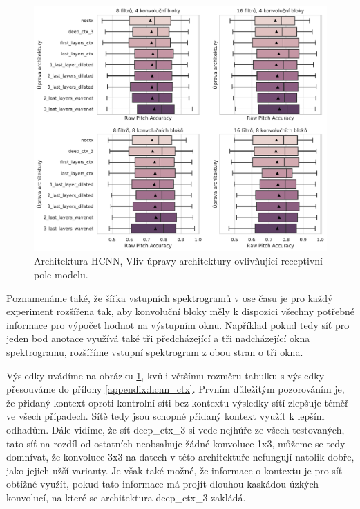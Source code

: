 \begin{figure}[h]\centering
    \includegraphics[width=\textwidth,height=\textheight,keepaspectratio]{../img/figures/spectrogram_ctx_archs}
\caption{Architektura HCNN, Vliv úpravy architektury ovlivňující receptivní pole modelu.}\label{obr:spectrogram_ctx_archs}
\end{figure}

Poznamenáme také, že šířka vstupních spektrogramů v ose času je pro každý experiment rozšířena tak, aby konvoluční bloky měly k dispozici všechny potřebné informace pro výpočet hodnot na výstupním oknu. Například pokud tedy síť pro jeden bod anotace využívá také tři předcházející a tři nadcházející okna spektrogramu, rozšíříme vstupní spektrogram z obou stran o tři okna.


Výsledky uvádíme na obrázku \ref{obr:spectrogram_ctx_archs}, kvůli většímu rozměru tabulku s výsledky přesouváme do přílohy \ref{appendix:hcnn_ctx}. Prvním důležitým pozorováním je, že přidaný kontext oproti kontrolní síti bez kontextu výsledky sítí zlepšuje téměř ve všech případech. Sítě tedy jsou schopné přidaný kontext využít k lepším odhadům. Dále vidíme, že síť deep\_ctx\_3 si vede nejhůře ze všech testovaných, tato síť na rozdíl od ostatních neobsahuje žádné konvoluce 1x3, můžeme se tedy domnívat, že konvoluce 3x3 na datech v této architektuře nefungují natolik dobře, jako jejich užší varianty. Je však také možné, že informace o kontextu je pro síť obtížné využít, pokud tato informace má projít dlouhou kaskádou úzkých konvolucí, na které se architektura deep\_ctx\_3 zakládá.


